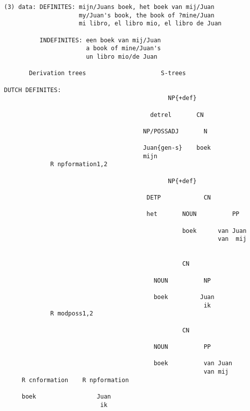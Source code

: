 \begin{verbatim}
(3) data: DEFINITES: mijn/Juans boek, het boek van mij/Juan
                     my/Juan's book, the book of ?mine/Juan 
                     mi libro, el libro mio, el libro de Juan

          INDEFINITES: een boek van mij/Juan
                       a book of mine/Juan's
                       un libro mio/de Juan

       Derivation trees                     S-trees      

DUTCH DEFINITES:
                                              NP{+def}

                                         detrel       CN

                                       NP/POSSADJ       N

                                       Juan{gen-s}    boek
                                       mijn
             R npformation1,2

                                              NP{+def}

                                        DETP            CN

                                        het       NOUN          PP

                                                  boek      van Juan
                                                            van  mij


                                                  CN
                                            
                                          NOUN          NP

                                          boek         Juan              
                                                        ik
             R modposs1,2

                                                  CN

                                          NOUN          PP

                                          boek          van Juan
                                                        van mij
     R cnformation    R npformation

     boek                 Juan                           
                           ik
\end{verbatim}
\newpage
